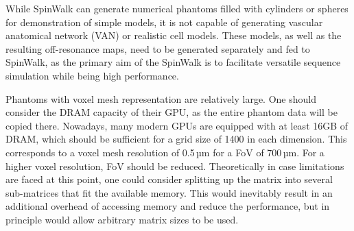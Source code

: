 While SpinWalk can generate numerical phantoms filled with cylinders or spheres for demonstration of simple models, it is not capable of generating vascular anatomical network (VAN) or realistic cell models. These models, as well as the resulting off-resonance maps, need to be generated separately and fed to SpinWalk, as the primary aim of the SpinWalk is to facilitate versatile sequence simulation while being high performance.

Phantoms with voxel mesh representation are relatively large. One should consider the DRAM capacity of their GPU, as the entire phantom data will be copied there. Nowadays, many modern GPUs are equipped with at least 16GB of DRAM, which should be sufficient for a grid size of 1400 in each dimension. This corresponds to a voxel mesh resolution of 0.5\,µm for a FoV of 700\,µm. For a higher voxel resolution, FoV should be reduced. Theoretically in case limitations are faced at this point, one could consider splitting up the matrix into several sub-matrices that fit the available memory. This would inevitably result in an additional overhead of accessing memory and reduce the performance, but in principle would allow arbitrary matrix sizes to be used.
